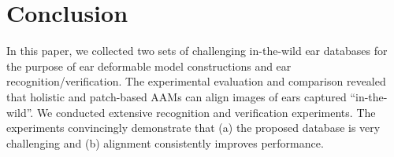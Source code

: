 



\section{Conclusion}
In this paper, we collected two sets of challenging in-the-wild ear databases for the purpose of ear deformable model constructions and ear recognition/verification. The experimental evaluation and comparison revealed that holistic and patch-based AAMs can align images of ears captured ``in-the-wild''. We conducted extensive recognition and verification experiments. The experiments convincingly  demonstrate that (a) the proposed database is very challenging and (b) alignment consistently improves performance.